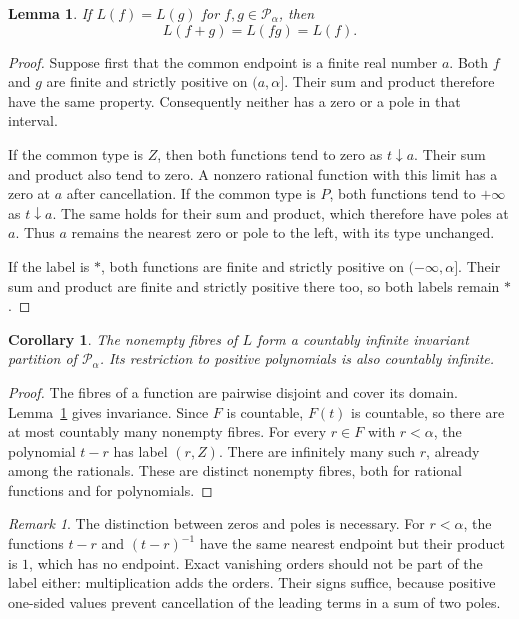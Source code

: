 \documentclass[11pt]{article}
\newtheorem{lemma}[theorem]{Lemma}
\newtheorem{corollary}[theorem]{Corollary}
\theoremstyle{remark}
\newtheorem{remark}[theorem]{Remark}
\begin{document}
\begin{lemma}\label{lem:left}
If $L(f)=L(g)$ for $f,g\in\mathcal P_\alpha$, then
\[
 L(f+g)=L(fg)=L(f).
\]
\end{lemma}
\begin{proof}
Suppose first that the common endpoint is a finite real number $a$. Both $f$ and $g$ are finite and strictly positive on $(a,\alpha]$. Their sum and product therefore have the same property. Consequently neither has a zero or a pole in that interval.

If the common type is $Z$, then both functions tend to zero as $t\downarrow a$. Their sum and product also tend to zero. A nonzero rational function with this limit has a zero at $a$ after cancellation. If the common type is $P$, both functions tend to $+\infty$ as $t\downarrow a$. The same holds for their sum and product, which therefore have poles at $a$. Thus $a$ remains the nearest zero or pole to the left, with its type unchanged.

If the label is $*$, both functions are finite and strictly positive on $(-\infty,\alpha]$. Their sum and product are finite and strictly positive there too, so both labels remain $*$.
\end{proof}

\begin{corollary}\label{cor:left}
The nonempty fibres of $L$ form a countably infinite invariant partition of $\mathcal P_\alpha$. Its restriction to positive polynomials is also countably infinite.
\end{corollary}
\begin{proof}
The fibres of a function are pairwise disjoint and cover its domain. Lemma~\ref{lem:left} gives invariance. Since $F$ is countable, $F(t)$ is countable, so there are at most countably many nonempty fibres. For every $r\in F$ with $r<\alpha$, the polynomial $t-r$ has label $(r,Z)$. There are infinitely many such $r$, already among the rationals. These are distinct nonempty fibres, both for rational functions and for polynomials.
\end{proof}

\begin{remark}\label{rem:types}
The distinction between zeros and poles is necessary. For $r<\alpha$, the functions $t-r$ and $(t-r)^{-1}$ have the same nearest endpoint but their product is $1$, which has no endpoint. Exact vanishing orders should not be part of the label either: multiplication adds the orders. Their signs suffice, because positive one-sided values prevent cancellation of the leading terms in a sum of two poles.
\end{remark}
\end{document}
